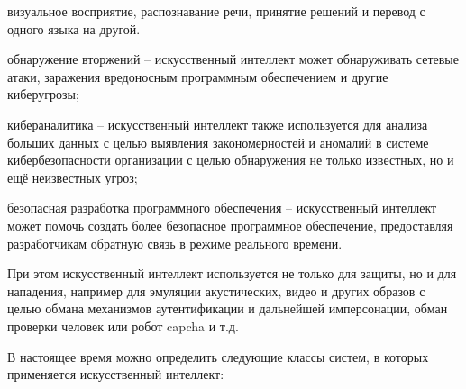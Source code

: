 \begin{textitemize}
	\item визуальное восприятие, распознавание речи, принятие решений и перевод с одного языка на другой.
	
	\item обнаружение вторжений -- искусственный интеллект может обнаруживать сетевые атаки, заражения вредоносным программным обеспечением и другие киберугрозы;
	
	\item кибераналитика -- искусственный интеллект также используется для анализа больших данных с целью выявления закономерностей и аномалий в системе кибербезопасности организации с целью обнаружения не только известных, но и ещё неизвестных угроз;
	
	\item безопасная разработка программного обеспечения -- искусственный интеллект может помочь создать более безопасное программное обеспечение, предоставляя разработчикам обратную связь в режиме реального времени.
\end{textitemize}

При этом искусственный интеллект используется не только для защиты, но и для нападения, например для эмуляции акустических, видео и других образов с целью обмана механизмов аутентификации и дальнейшей имперсонации, обман проверки человек или робот capcha и т.д.

В настоящее время можно определить следующие классы систем, в которых применяется искусственный интеллект:

